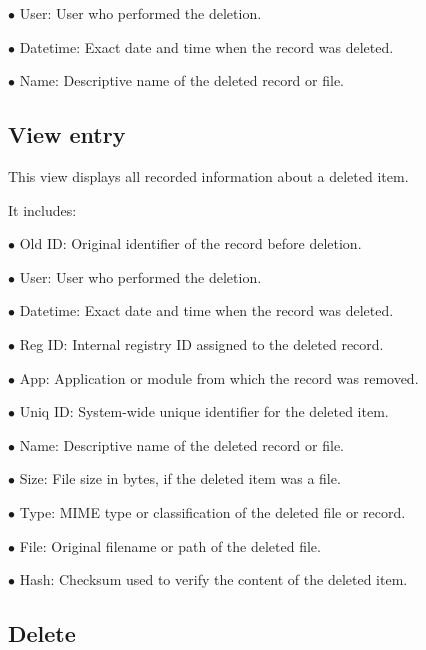 \documentclass[a4paper]{article}
\begin{document}
\begin{compactitem}
\item[\color{myblue}$\bullet$] User: User who performed the deletion.
\item[\color{myblue}$\bullet$] Datetime: Exact date and time when the record was deleted.
\item[\color{myblue}$\bullet$] Name: Descriptive name of the deleted record or file.
\end{compactitem}

\hypertarget{toc34}{}
\subsection{View entry}

This view displays all recorded information about a deleted item.

It includes:

\begin{compactitem}
\item[\color{myblue}$\bullet$] Old ID: Original identifier of the record before deletion.
\item[\color{myblue}$\bullet$] User: User who performed the deletion.
\item[\color{myblue}$\bullet$] Datetime: Exact date and time when the record was deleted.
\item[\color{myblue}$\bullet$] Reg ID: Internal registry ID assigned to the deleted record.
\item[\color{myblue}$\bullet$] App: Application or module from which the record was removed.
\item[\color{myblue}$\bullet$] Uniq ID: System-wide unique identifier for the deleted item.
\item[\color{myblue}$\bullet$] Name: Descriptive name of the deleted record or file.
\item[\color{myblue}$\bullet$] Size: File size in bytes, if the deleted item was a file.
\item[\color{myblue}$\bullet$] Type: MIME type or classification of the deleted file or record.
\item[\color{myblue}$\bullet$] File: Original filename or path of the deleted file.
\item[\color{myblue}$\bullet$] Hash: Checksum used to verify the content of the deleted item.
\end{compactitem}

\hypertarget{toc35}{}
\subsection{Delete}
\end{document}
